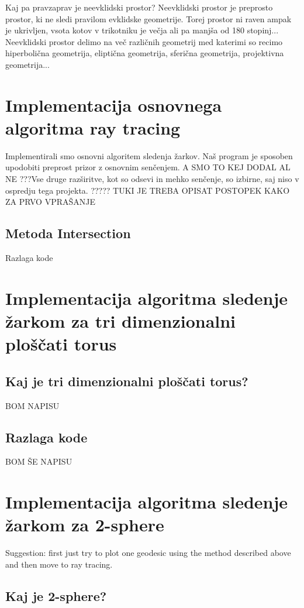 \documentclass[titlepage]{article}
\begin{document}
Kaj pa pravzaprav je neevklidski prostor?
Neevklidski prostor je preprosto prostor, ki ne sledi pravilom evklidske geometrije. Torej prostor ni raven ampak je ukrivljen, vsota kotov v trikotniku je večja ali pa manjša od 180 stopinj... Neevklidski prostor delimo na več različnih geometrij med katerimi so recimo hiperbolična geometrija, eliptična geometrija, sferična geometrija, projektivna geometrija... 



\section {Implementacija osnovnega algoritma ray tracing}
Implementirali smo osnovni algoritem sledenja žarkov. Naš program je sposoben upodobiti preprost prizor z osnovnim senčenjem. 
A SMO TO KEJ DODAL AL NE ???Vse druge razširitve, kot so odsevi in mehko senčenje, so izbirne, saj niso v ospredju tega projekta. ????? TUKI JE TREBA OPISAT POSTOPEK KAKO ZA PRVO VPRAŠANJE 

\subsection{Metoda Intersection}
Razlaga kode 


\section{Implementacija algoritma sledenje žarkom za tri dimenzionalni ploščati torus} 

\subsection{Kaj je tri dimenzionalni ploščati torus?}
BOM NAPISU

\subsection{Razlaga kode}

BOM ŠE NAPISU

\section{Implementacija algoritma sledenje žarkom za 2-sphere}
Suggestion: first just try to plot one geodesic
using the method described above and then move to ray tracing.

\subsection{Kaj je 2-sphere?}
\end{document}

